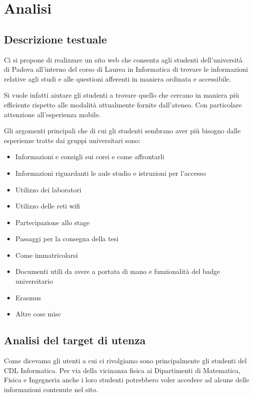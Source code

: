 \section{Analisi}
\subsection{Descrizione testuale}

Ci si propone di realizzare un sito web che consenta agli studenti dell'università di Padova all'interno del corso di Laurea in Informatica di trovare le informazioni relative agli studi e alle questioni afferenti in maniera ordinata e accessibile.

Si vuole infatti aiutare gli studenti a trovare quello che cercano in maniera più efficiente rispetto alle modalità attualmente fornite dall'ateneo. Con particolare attenzione all'esperienza mobile.

Gli argomenti principali che di cui gli studenti sembrano aver più bisogno dalle esperienze tratte dai gruppi universitari sono:
\begin{itemize}
    \item Informazioni e consigli sui corsi e come affrontarli %
    \item Informazioni riguardanti le aule studio e istruzioni per l'accesso
    \item Utilizzo dei laboratori
    \item Utilizzo delle reti wifi
    \item Partecipazione allo stage
    \item Passaggi per la consegna della tesi
    \item Come immatricolarsi %
    \item Documenti utili da avere a portata di mano e funzionalità del badge universitario %
    \item Erasmus
    \item Altre cose misc
\end{itemize}

\subsection{Analisi del target di utenza}

Come dicevamo gli utenti a cui ci rivolgiamo sono principalmente gli studenti del CDL Informatica. Per via della vicinanza fisica ai Dipartimenti di Matematica, Fisica e Ingegneria anche i loro studenti potrebbero voler accedere ad alcune delle informazioni contenute nel sito.

